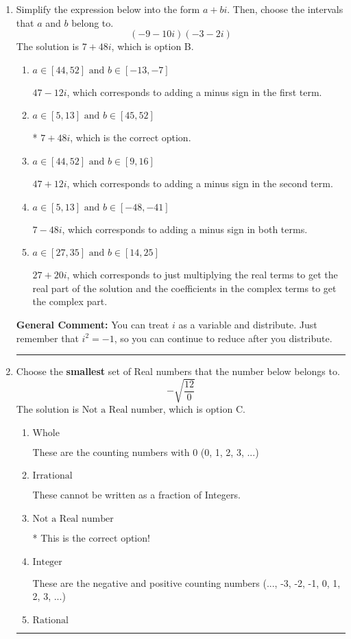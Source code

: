 \documentclass{extbook}[14pt]
\newcommand{\litem}[1]{\item #1

\rule{\textwidth}{0.4pt}}
\begin{document}
\begin{enumerate}\litem{
Simplify the expression below into the form $a+bi$. Then, choose the intervals that $a$ and $b$ belong to.
\[ (-9 - 10 i)(-3 - 2 i) \]The solution is \( 7 + 48 i \), which is option B.\begin{enumerate}[label=\Alph*.]
\item \( a \in [44, 52] \text{ and } b \in [-13, -7] \)

 $47 - 12 i$, which corresponds to adding a minus sign in the first term.
\item \( a \in [5, 13] \text{ and } b \in [45, 52] \)

* $7 + 48 i$, which is the correct option.
\item \( a \in [44, 52] \text{ and } b \in [9, 16] \)

 $47 + 12 i$, which corresponds to adding a minus sign in the second term.
\item \( a \in [5, 13] \text{ and } b \in [-48, -41] \)

 $7 - 48 i$, which corresponds to adding a minus sign in both terms.
\item \( a \in [27, 35] \text{ and } b \in [14, 25] \)

 $27 + 20 i$, which corresponds to just multiplying the real terms to get the real part of the solution and the coefficients in the complex terms to get the complex part.
\end{enumerate}

\textbf{General Comment:} You can treat $i$ as a variable and distribute. Just remember that $i^2=-1$, so you can continue to reduce after you distribute.
}
\litem{
Choose the \textbf{smallest} set of Real numbers that the number below belongs to.
\[ -\sqrt{\frac{12}{0}} \]The solution is \( \text{Not a Real number} \), which is option C.\begin{enumerate}[label=\Alph*.]
\item \( \text{Whole} \)

These are the counting numbers with 0 (0, 1, 2, 3, ...)
\item \( \text{Irrational} \)

These cannot be written as a fraction of Integers.
\item \( \text{Not a Real number} \)

* This is the correct option!
\item \( \text{Integer} \)

These are the negative and positive counting numbers (..., -3, -2, -1, 0, 1, 2, 3, ...)
\item \( \text{Rational} \)


\end{enumerate}}
\end{enumerate}
\end{document}
